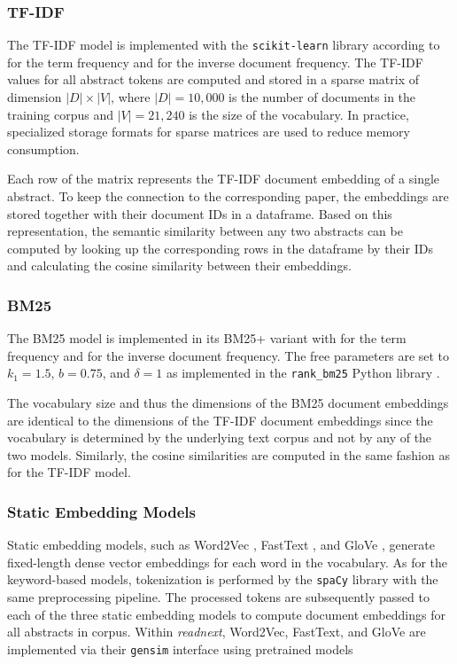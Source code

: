 \subsubsection*{TF-IDF}

The TF-IDF model is implemented with the \texttt{scikit-learn} library \cite{PedregosaScikitlearnMachine2011} according to  for the term frequency and  for the inverse document frequency.
The TF-IDF values for all abstract tokens are computed and stored in a sparse matrix of dimension $|D| \times |V|$, where $|D| = 10,000$ is the number of documents in the training corpus and $|V|=21,240$ is the size of the vocabulary.
In practice, specialized storage formats for sparse matrices are used to reduce memory consumption.

Each row of the matrix represents the TF-IDF document embedding of a single abstract.
To keep the connection to the corresponding paper, the embeddings are stored together with their document IDs in a dataframe.
Based on this representation, the semantic similarity between any two abstracts can be computed by looking up the corresponding rows in the dataframe by their IDs and calculating the cosine similarity between their embeddings.


\subsubsection*{BM25}

The BM25 model is implemented in its BM25+ variant with  for the term frequency and  for the inverse document frequency.
The free parameters are set to $k_1 = 1.5$, $b = 0.75$, and $\delta = 1$ as implemented in the \texttt{rank\_bm25} Python library \cite{BrownRankBM25Collection2020}.

The vocabulary size and thus the dimensions of the BM25 document embeddings are identical to the dimensions of the TF-IDF document embeddings since the vocabulary is determined by the underlying text corpus and not by any of the two models. Similarly, the cosine similarities are computed in the same fashion as for the TF-IDF model.


\subsubsection*{Static Embedding Models}

Static embedding models, such as Word2Vec \cite{MikolovEfficientEstimation2013}, FastText \cite{BojanowskiEnrichingWord2017}, and GloVe \cite{PenningtonGloveGlobal2014}, generate fixed-length dense vector embeddings for each word in the vocabulary.
As for the keyword-based models, tokenization is performed by the \texttt{spaCy} library with the same preprocessing pipeline.
The processed tokens are subsequently passed to each of the three static embedding models to compute document embeddings for all abstracts in corpus. Within \emph{readnext}, Word2Vec, FastText, and GloVe are implemented via their \texttt{gensim} interface \cite{RehurekGensimPython2011} using pretrained models

